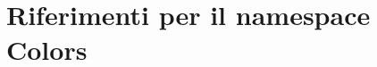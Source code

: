 \hypertarget{namespace_colors}{}\section{Riferimenti per il namespace Colors}
\label{namespace_colors}

